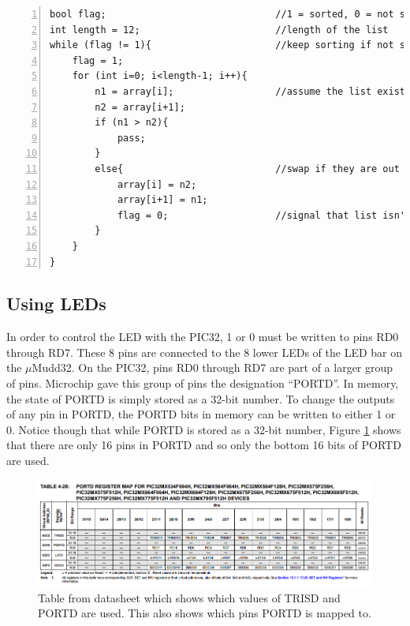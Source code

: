 \documentclass[11pt]{article}
\begin{document}
\begin{lstlisting}[numbers=left,basicstyle=\footnotesize]
bool flag;                              //1 = sorted, 0 = not sorted
int length = 12;                        //length of the list
while (flag != 1){                      //keep sorting if not sorted
    flag = 1;                           
    for (int i=0; i<length-1; i++){     
        n1 = array[i];                  //assume the list exists somewhere
        n2 = array[i+1];
        if (n1 > n2){
            pass;
        }
        else{                           //swap if they are out of order
            array[i] = n2;              
            array[i+1] = n1;
            flag = 0;                   //signal that list isn't sorted
        }
    }
}
\end{lstlisting}


\subsection{Using LEDs}

In order to control the LED with the PIC32, 1 or 0 must be written to pins RD0 through RD7. These 8 pins are connected to the 8 lower LEDs of the LED bar on the $\mu$Mudd32. On the PIC32, pins RD0 through RD7 are part of a larger group of pins. Microchip gave this group of pins the designation \enquote{PORTD}. In memory, the state of PORTD is simply stored as a 32-bit number. To change the outputs of any pin in PORTD, the PORTD bits in memory can be written to either 1 or 0. Notice though that while PORTD is stored as a 32-bit number, Figure \ref{fig:TRISD} shows that there are only 16 pins in PORTD and so only the bottom 16 bits of PORTD are used. \\

\begin{figure}[h!]
\centering
\includegraphics[scale=0.9,angle=90]{TRISD_and_PORTD.png}
\caption{Table from datasheet which shows which values of TRISD and PORTD are used. This also shows which pins PORTD is mapped to.}
\label{fig:TRISD}
\end{figure} 
\end{document}
